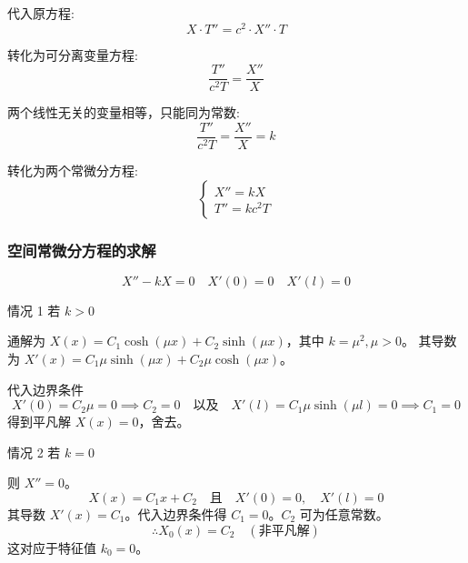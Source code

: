 \documentclass[12pt,a4paper]{article}
\numberwithin{subsection}{section}
\numberwithin{subsubsection}{subsection}
\theoremstyle{plain}
\theoremstyle{definition}
\theoremstyle{remark}
\begin{document}
	代入原方程:
	\begin{equation} \label{eq:original_substitution_neumann}
		X \cdot T'' = c^2 \cdot X'' \cdot T
	\end{equation}
	
	转化为可分离变量方程:
	\begin{equation} \label{eq:separation_neumann}
		\frac{T''}{c^2 T} = \frac{X''}{X}
	\end{equation}
	
	两个线性无关的变量相等，只能同为常数:
	\begin{equation} \label{eq:constant_neumann}
		\frac{T''}{c^2 T} = \frac{X''}{X} = k
	\end{equation}
	
	转化为两个常微分方程:
	\begin{equation} \label{eq:ode_neumann}
		\begin{cases}
			X'' = kX \\
			T'' = k c^2 T
		\end{cases}
	\end{equation}
	
	\subsubsection{空间常微分方程的求解}
	\begin{equation}
		X'' - kX = 0 \quad X'(0) = 0 \quad X'(l) = 0
	\end{equation}
	
	情况 1 \quad 若 \(k > 0\)
	
	通解为 \(X(x) = C_1 \cosh(\mu x) + C_2 \sinh(\mu x)\)，其中 \(k = \mu^2, \mu>0\)。
	其导数为 $X'(x) = C_1 \mu \sinh(\mu x) + C_2 \mu \cosh(\mu x)$。
	
	代入边界条件
	\begin{equation}
		X'(0) = C_2 \mu = 0 \implies C_2 = 0 \quad \text{以及} \quad X'(l) = C_1 \mu \sinh(\mu l) = 0 \implies C_1 = 0
	\end{equation}
	得到平凡解 $X(x)=0$，舍去。
	
	情况 2 \quad 若 \(k = 0\)
	
	则 \(X'' = 0\)。
	\begin{equation}
		X(x) = C_1 x + C_2 \quad \text{且} \quad X'(0) = 0, \quad X'(l) = 0
	\end{equation}
	其导数 $X'(x) = C_1$。代入边界条件得 $C_1=0$。$C_2$ 可为任意常数。
	\begin{equation}
		\therefore X_0(x) = C_2 \quad (\text{非平凡解})
	\end{equation}
	这对应于特征值 $k_0=0$。
	
\end{document}
